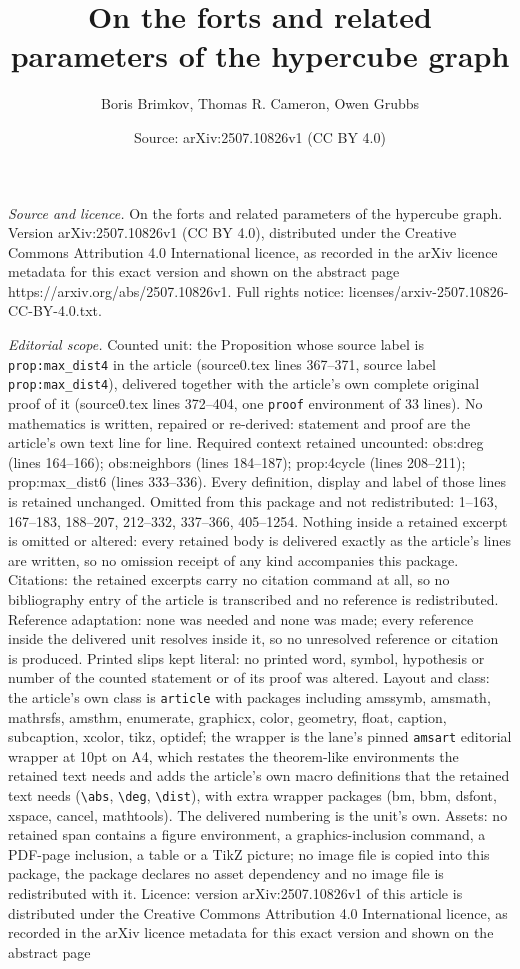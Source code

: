 \documentclass[10pt,a4paper]{amsart}
\title[On the forts and related parameters of the hypercube graph]{On the forts and related parameters of the hypercube graph}
\author{Boris Brimkov, Thomas R. Cameron, Owen Grubbs}
\date{Source: arXiv:2507.10826v1 (CC BY 4.0)}
\begin{document}
\maketitle

\noindent\emph{Source and licence.} On the forts and related parameters of the hypercube graph. Version arXiv:2507.10826v1 (CC BY 4.0), distributed under the Creative Commons Attribution 4.0 International licence, as recorded in the arXiv licence metadata for this exact version and shown on the abstract page https://arxiv.org/abs/2507.10826v1. Full rights notice: licenses/arxiv-2507.10826-CC-BY-4.0.txt.\par\smallskip

\noindent\textit{Editorial scope.} Counted unit: the Proposition whose source label is \texttt{prop:max\_dist4} in the article (source0.tex lines 367--371, source label \texttt{prop:max\_dist4}), delivered together with the article's own complete original proof of it (source0.tex lines 372--404, one \texttt{proof} environment of 33 lines). No mathematics is written, repaired or re-derived: statement and proof are the article's own text line for line. Required context retained uncounted: obs:dreg (lines 164--166); obs:neighbors (lines 184--187); prop:4cycle (lines 208--211); prop:max\_dist6 (lines 333--336). Every definition, display and label of those lines is retained unchanged. Omitted from this package and not redistributed: 1--163, 167--183, 188--207, 212--332, 337--366, 405--1254. Nothing inside a retained excerpt is omitted or altered: every retained body is delivered exactly as the article's lines are written, so no omission receipt of any kind accompanies this package. Citations: the retained excerpts carry no citation command at all, so no bibliography entry of the article is transcribed and no reference is redistributed. Reference adaptation: none was needed and none was made; every reference inside the delivered unit resolves inside it, so no unresolved reference or citation is produced. Printed slips kept literal: no printed word, symbol, hypothesis or number of the counted statement or of its proof was altered. Layout and class: the article's own class is \texttt{article} with packages including amssymb, amsmath, mathrsfs, amsthm, enumerate, graphicx, color, geometry, float, caption, subcaption, xcolor, tikz, optidef; the wrapper is the lane's pinned \texttt{amsart} editorial wrapper at 10pt on A4, which restates the theorem-like environments the retained text needs and adds the article's own macro definitions that the retained text needs (\texttt{\textbackslash abs}, \texttt{\textbackslash deg}, \texttt{\textbackslash dist}), with extra wrapper packages (bm, bbm, dsfont, xspace, cancel, mathtools). The delivered numbering is the unit's own. Assets: no retained span contains a figure environment, a graphics-inclusion command, a PDF-page inclusion, a table or a TikZ picture; no image file is copied into this package, the package declares no asset dependency and no image file is redistributed with it. Licence: version arXiv:2507.10826v1 of this article is distributed under the Creative Commons Attribution 4.0 International licence, as recorded in the arXiv licence metadata for this exact version and shown on the abstract page 
\end{document}
